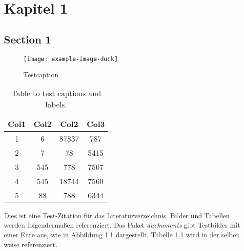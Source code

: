 
\chapter{Kapitel 1 }
\section{Section 1}
\blindtext
\begin{figure}[h!]
\begin{center}
\texttt{[image: example-image-duck]} %
\caption{Testcaption}
\label{fig:ente}
\end{center}
\end{figure}

\begin{table}[h!]
\centering
\begin{tabular}{||c c c c||} 
 \hline
 Col1 & Col2 & Col2 & Col3 \\ [0.5ex] 
 \hline\hline
 1 & 6 & 87837 & 787 \\ 
 2 & 7 & 78 & 5415 \\
 3 & 545 & 778 & 7507 \\
 4 & 545 & 18744 & 7560 \\
 5 & 88 & 788 & 6344 \\ [1ex] 
 \hline
\end{tabular}
\caption{Table to test captions and labels.}
\label{table:1}
\end{table}

Dies ist eine Test-Zitation \cite{texbook} für das Literaturverzeichnis. Bilder und Tabellen werden folgendermaßen referenziert. Das Paket \textit{duckuments} gibt Testbilder mit einer Ente aus, wie in Abbildung \ref{fig:ente} dargestellt. Tabelle \ref{table:1} wird in der selben weise referenziert.